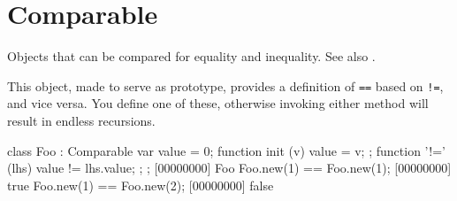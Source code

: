 \section{Comparable}
Objects that can be compared for equality and inequality.  See also
.

This object, made to serve as prototype, provides a definition of
\lstinline{==} based on \lstinline{!=}, and vice versa.  You
 define one of these, otherwise invoking either method
will result in endless recursions.

\begin{urbiscript}
class Foo : Comparable
{
  var value = 0;
  function init (v) { value = v; };
  function '!=' (lhs) { value != lhs.value; };
};
[00000000] Foo
Foo.new(1) == Foo.new(1);
[00000000] true
Foo.new(1) == Foo.new(2);
[00000000] false
\end{urbiscript}

